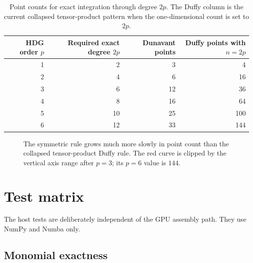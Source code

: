 \documentclass[11pt]{article}
\begin{document}
\begin{table}[htbp]
\centering
\begin{tabular}{rrrr}
\toprule
HDG order \(p\) & Required exact degree \(2p\) & Dunavant points & Duffy points with \(n=2p\) \\
\midrule
1 & 2  & 3  & 4 \\
2 & 4  & 6  & 16 \\
3 & 6  & 12 & 36 \\
4 & 8  & 16 & 64 \\
5 & 10 & 25 & 100 \\
6 & 12 & 33 & 144 \\
\bottomrule
\end{tabular}
\caption{Point counts for exact integration through degree \(2p\).  The Duffy
column is the current collapsed tensor-product pattern when the one-dimensional
count is set to \(2p\).}
\label{tab:point-counts}
\end{table}

\begin{figure}[htbp]
\centering
{}
\caption{The symmetric rule grows much more slowly in point count than the
collapsed tensor-product Duffy rule.  The red curve is clipped by the vertical
axis range after \(p=3\); its \(p=6\) value is \(144\).}
\label{fig:point-growth}
\end{figure}

\section{Test matrix}

The host tests are deliberately independent of the GPU assembly path.  They
use NumPy and Numba only.

\subsection{Monomial exactness}
\end{document}
